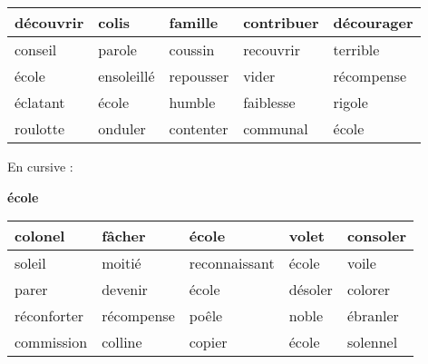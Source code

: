 \documentclass[a4paper, 11pt]{article}
\begin{document}
\begin{onehalfspace}
{\begin{center}
\begin{tabulary}{17cm}{|h|h|h|h|h|}
    découvrir & colis & famille & contribuer & décourager\\\hline
conseil & parole & coussin & recouvrir & terrible\\\hline
école & ensoleillé & repousser & vider & récompense\\\hline
éclatant & école & humble & faiblesse & rigole\\\hline
roulotte & onduler & contenter & communal & école\\\hline


    \end{tabulary}
\end{center}
}
\vspace{0.5cm}

{\large
\noindent En cursive :

\begin{center}
    {\huge \bfseries {\cursive
        école
    }}
    \vspace{0.25cm}\\
    \begin{tabulary}{17cm}{|i|i|i|i|i|}
    \hline

    colonel & fâcher & école & volet & consoler\\\hline
soleil & moitié & reconnaissant & école & voile\\\hline
parer & devenir & école & désoler & colorer\\\hline
réconforter & récompense & poêle & noble & ébranler\\\hline
commission & colline & copier & école & solennel\\\hline


    \end{tabulary}
\end{center}
}


\end{onehalfspace}
\end{document}
